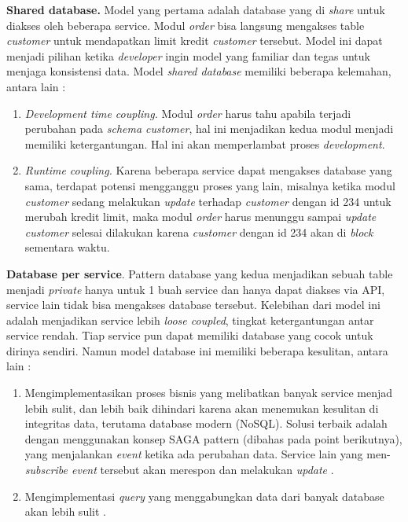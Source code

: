 \textbf{Shared database.} Model yang pertama adalah database yang di \textit{share} untuk diakses oleh beberapa service. Modul \textit{order} bisa langsung mengakses table \textit{customer} untuk mendapatkan limit kredit \textit{customer} tersebut. Model ini dapat menjadi pilihan ketika \textit{developer} ingin model yang familiar dan tegas untuk menjaga konsistensi data. Model \textit{shared database} memiliki beberapa kelemahan, antara lain :
\begin{enumerate}[leftmargin=*]
	\item \textit{Development time coupling.} Modul \textit{order} harus tahu apabila terjadi perubahan pada \textit{schema customer}, hal ini menjadikan kedua modul menjadi memiliki ketergantungan. Hal ini akan memperlambat proses \textit{development}.
	\item \textit{Runtime coupling.} Karena beberapa service dapat mengakses database yang sama, terdapat potensi mengganggu proses yang lain, misalnya ketika modul \textit{customer} sedang melakukan \textit{update} terhadap \textit{customer} dengan id 234 untuk merubah kredit limit, maka modul \textit{order} harus menunggu sampai \textit{update customer} selesai dilakukan karena \textit{customer} dengan id 234 akan di \textit{block} sementara waktu.
\end{enumerate}
\textbf{Database per service}. Pattern database yang kedua menjadikan sebuah table menjadi \textit{private} hanya untuk 1 buah service dan hanya dapat diakses via API, service lain tidak bisa mengakses database tersebut. Kelebihan dari model ini adalah menjadikan service lebih \textit{loose coupled}, tingkat ketergantungan antar service rendah. Tiap service pun dapat memiliki database yang cocok untuk dirinya sendiri. Namun model database ini memiliki beberapa kesulitan, antara lain :
\begin{enumerate}[leftmargin=*]
	\item Mengimplementasikan proses bisnis yang melibatkan banyak service menjad lebih sulit, dan lebih baik dihindari karena akan menemukan kesulitan di integritas data, terutama database modern (NoSQL). Solusi terbaik adalah dengan menggunakan konsep SAGA pattern (dibahas pada point berikutnya), yang menjalankan \textit{event} ketika ada perubahan data. Service lain yang men-\textit{subscribe event} tersebut akan merespon dan melakukan \textit{update} \cite{6}.
	\item Mengimplementasi \textit{query} yang menggabungkan data dari banyak database akan lebih sulit \cite{6}.
\end{enumerate}

